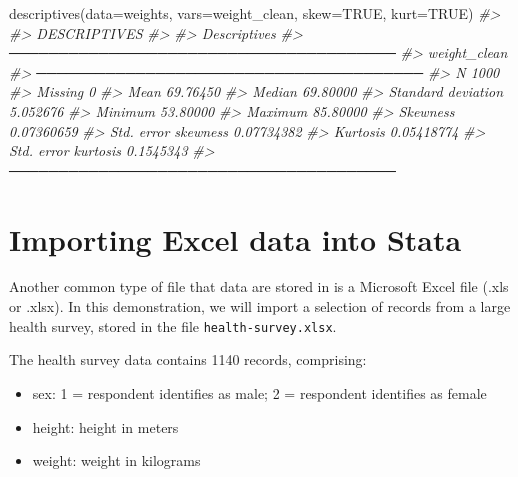 \documentclass[
]{memoir}
\newenvironment{Shaded}{\begin{snugshade}}{\end{snugshade}}
\newcommand{\AttributeTok}[1]{\textcolor[rgb]{0.77,0.63,0.00}{#1}}
\newcommand{\CommentTok}[1]{\textcolor[rgb]{0.56,0.35,0.01}{\textit{#1}}}
\newcommand{\ConstantTok}[1]{\textcolor[rgb]{0.00,0.00,0.00}{#1}}
\newcommand{\FunctionTok}[1]{\textcolor[rgb]{0.00,0.00,0.00}{#1}}
\newcommand{\NormalTok}[1]{#1}
\providecommand{\tightlist}{%
  \setlength{\itemsep}{0pt}\setlength{\parskip}{0pt}}
\begin{document}
\begin{Shaded}
\begin{Highlighting}[]
\FunctionTok{descriptives}\NormalTok{(}\AttributeTok{data=}\NormalTok{weights, }\AttributeTok{vars=}\NormalTok{weight\_clean, }\AttributeTok{skew=}\ConstantTok{TRUE}\NormalTok{, }\AttributeTok{kurt=}\ConstantTok{TRUE}\NormalTok{)}
\CommentTok{\#\textgreater{} }
\CommentTok{\#\textgreater{}  DESCRIPTIVES}
\CommentTok{\#\textgreater{} }
\CommentTok{\#\textgreater{}  Descriptives                            }
\CommentTok{\#\textgreater{}  ─────────────────────────────────────── }
\CommentTok{\#\textgreater{}                           weight\_clean   }
\CommentTok{\#\textgreater{}  ─────────────────────────────────────── }
\CommentTok{\#\textgreater{}    N                              1000   }
\CommentTok{\#\textgreater{}    Missing                           0   }
\CommentTok{\#\textgreater{}    Mean                       69.76450   }
\CommentTok{\#\textgreater{}    Median                     69.80000   }
\CommentTok{\#\textgreater{}    Standard deviation         5.052676   }
\CommentTok{\#\textgreater{}    Minimum                    53.80000   }
\CommentTok{\#\textgreater{}    Maximum                    85.80000   }
\CommentTok{\#\textgreater{}    Skewness                 0.07360659   }
\CommentTok{\#\textgreater{}    Std. error skewness      0.07734382   }
\CommentTok{\#\textgreater{}    Kurtosis                 0.05418774   }
\CommentTok{\#\textgreater{}    Std. error kurtosis       0.1545343   }
\CommentTok{\#\textgreater{}  ───────────────────────────────────────}
\end{Highlighting}
\end{Shaded}

\hypertarget{import-excel}{%
\section{Importing Excel data into Stata}\label{import-excel}}

Another common type of file that data are stored in is a Microsoft Excel file (.xls or .xlsx). In this demonstration, we will import a selection of records from a large health survey, stored in the file \texttt{health-survey.xlsx}.

The health survey data contains 1140 records, comprising:

\begin{itemize}
\tightlist
\item
  sex: 1 = respondent identifies as male; 2 = respondent identifies as female
\item
  height: height in meters
\item
  weight: weight in kilograms
\end{itemize}
\end{document}
